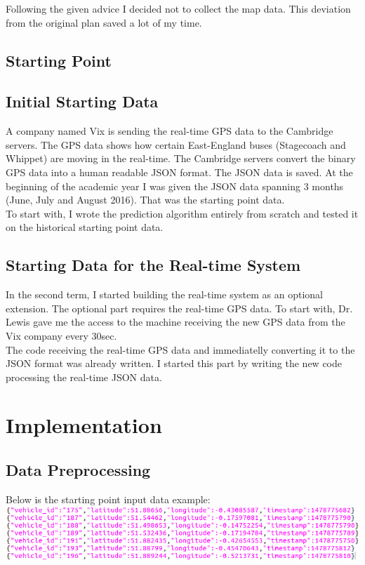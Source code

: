 \documentclass[12pt,a4paper,oneside,openright]{report}
\begin{document}
Following the given advice I decided not to collect the map data. This deviation from the
original plan saved a lot of my time.

\section{Starting Point}

\section*{Initial Starting Data}
A company named Vix is sending the real-time GPS data to the Cambridge servers. The GPS
data shows how certain East-England buses (Stagecoach and Whippet) are moving 
in the real-time. The Cambridge servers convert the binary GPS data into a human readable
JSON format. The JSON data is saved. At the beginning of the academic year I was given the
JSON data spanning 3 months (June, July and August 2016).
That was the starting point data. \\

To start with, I wrote the prediction algorithm entirely from scratch and tested it on the historical starting point data.

\section*{Starting Data for the Real-time System}
In the second term, I started building the real-time system as an optional extension.
The optional part requires the real-time GPS data. To start with, Dr. Lewis gave me
the access to the machine receiving the new GPS data from the Vix company every 30sec. \\

The code receiving the real-time GPS data and immediatelly converting it to the JSON format was already written.
I started this part by writing the new code processing the real-time JSON data.



\chapter{Implementation}

\section{Data Preprocessing}

Below is the starting point input data example: \\
\includegraphics[scale=0.6]{figs/starting_data.png}
\end{document}
